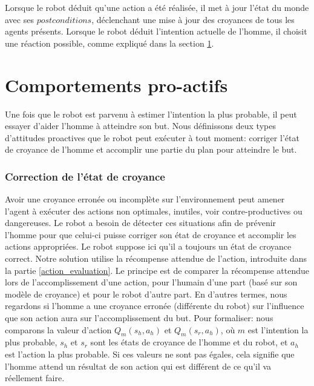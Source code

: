\documentclass[a4paper,11pt,twoside]{StyleThese}
\begin{document}
Lorsque le robot déduit qu'une action a été réalisée, il met à jour l'état du monde avec ses $postconditions$, déclenchant une mise à jour des croyances de tous les agents présents. Lorsque le robot déduit l'intention actuelle de l'homme, il choisit une réaction possible, comme expliqué dans la section \ref{sec:robot_reaction}.



\section{Comportements pro-actifs}
\label{sec:robot_reaction}

Une fois que le robot est parvenu à estimer l'intention la plus probable, il peut essayer d'aider l'homme à atteindre son but. Nous définissons deux types d'attitudes proactives que le robot peut exécuter à tout moment: corriger l'état de croyance de l'homme et accomplir une partie du plan pour atteindre le but.

\subsubsection{Correction de l'état de croyance}
\label{sec:correctingBf}
Avoir une croyance erronée ou incomplète sur l'environnement peut amener l'agent à exécuter des actions non optimales, inutiles, voir contre-productives ou dangereuses. Le robot a besoin de détecter ces situations afin de prévenir l'homme pour que celui-ci puisse corriger son état de croyance et accomplir les actions appropriées. Le robot suppose ici qu'il a toujours un état de croyance correct. Notre solution utilise la récompense attendue de l'action, introduite dans la partie \ref{action_evaluation}. Le principe est de comparer la récompense attendue lors de l'accomplissement d'une action, pour l'humain d'une part (basé sur son modèle de croyance) et pour le robot d'autre part. En d'autres termes, nous regardons si l'homme a une croyance erronée (différente du robot) sur l'influence que son action aura sur l'accomplissement du but. Pour formaliser: nous comparons la valeur d'action \(Q_m(s_h,a_h)\) et \(Q_m(s_r,a_h)\), où $m$ est l'intention la plus probable, $s_h$ et $s_r$ sont les états de croyance de l'homme et du robot, et $a_h$ est l'action la plus probable. Si ces valeurs ne sont pas égales, cela signifie que l'homme attend un résultat de son action qui est différent de ce qu'il va réellement faire.
\end{document}
